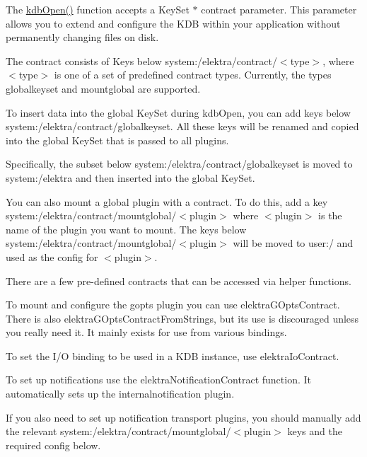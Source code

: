 The {\ttfamily \hyperlink{group__kdb_ga844e1299a84c3fbf1d3a905c5c893ba5}{kdb\+Open()}} function accepts a {\ttfamily Key\+Set $\ast$ contract} parameter. This parameter allows you to extend and configure the K\+DB within your application without permanently changing files on disk.

The contract consists of Keys below {\ttfamily system\+:/elektra/contract/$<$type$>$}, where {\ttfamily $<$type$>$} is one of a set of predefined contract types. Currently, the types {\ttfamily globalkeyset} and {\ttfamily mountglobal} are supported.

To insert data into the global Key\+Set during {\ttfamily kdb\+Open}, you can add keys below {\ttfamily system\+:/elektra/contract/globalkeyset}. All these keys will be renamed and copied into the global Key\+Set that is passed to all plugins.

Specifically, the subset below {\ttfamily system\+:/elektra/contract/globalkeyset} is moved to {\ttfamily system\+:/elektra} and then inserted into the global Key\+Set.

You can also mount a global plugin with a contract. To do this, add a key {\ttfamily system\+:/elektra/contract/mountglobal/$<$plugin$>$} where {\ttfamily $<$plugin$>$} is the name of the plugin you want to mount. The keys below {\ttfamily system\+:/elektra/contract/mountglobal/$<$plugin$>$} will be moved to {\ttfamily user\+:/} and used as the config for {\ttfamily $<$plugin$>$}.

There are a few pre-\/defined contracts that can be accessed via helper functions.

To mount and configure the {\ttfamily gopts} plugin you can use {\ttfamily elektra\+G\+Opts\+Contract}. There is also {\ttfamily elektra\+G\+Opts\+Contract\+From\+Strings}, but its use is discouraged unless you really need it. It mainly exists for use from various bindings.

To set the I/O binding to be used in a K\+DB instance, use {\ttfamily elektra\+Io\+Contract}.

To set up notifications use the {\ttfamily elektra\+Notification\+Contract} function. It automatically sets up the {\ttfamily internalnotification} plugin.

If you also need to set up notification transport plugins, you should manually add the relevant {\ttfamily system\+:/elektra/contract/mountglobal/$<$plugin$>$} keys and the required config below. 